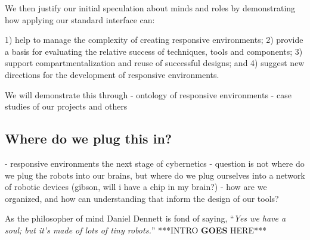 We then justify our initial speculation about minds and roles by demonstrating how applying our standard interface can:

1) help to manage the complexity of creating responsive environments;
2) provide a basis for evaluating the relative success of techniques, tools and components;
3) support compartmentalization and reuse of successful designs; and
4) suggest new directions for the development of responsive environments.

We will demonstrate this through
- ontology of responsive environments
- case studies of our projects and others

\subsection{Where do we plug this in?}
%
- responsive environments the next stage of cybernetics
- question is not where do we plug the robots into our brains, but where do we plug ourselves into a network of robotic devices (gibson, will i have a chip in my brain?)
- how are we organized, and how can understanding that inform the design of our tools?

As the philosopher of mind Daniel Dennett is fond of saying, ``\emph{Yes we have a soul; but it's made of lots of tiny robots.}'' \citeyearpar[p. 1]{freedom_evolves}
% 
***INTRO {\bf GOES} HERE*** \citep{society_of_mind}


